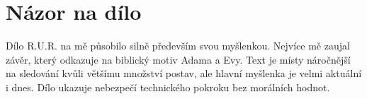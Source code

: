 \documentclass[12pt,a4paper]{article}
\begin{document}
\section*{Názor na dílo}
Dílo R.U.R. na mě působilo silně především svou myšlenkou. Nejvíce mě zaujal závěr, který odkazuje na biblický motiv Adama a Evy. Text je místy náročnější na sledování kvůli většímu množství postav, ale hlavní myšlenka je velmi aktuální i dnes. Dílo ukazuje nebezpečí technického pokroku bez morálních hodnot.

	
\end{document}
